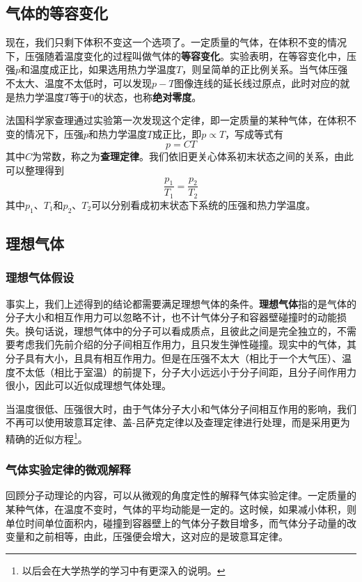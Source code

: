 \subsection{气体的等容变化} 
现在，我们只剩下体积不变这一个选项了。一定质量的气体，在体积不变的情况下，压强随着温度变化的过程叫做气体的\textbf{等容变化}。实验表明，在等容变化中，压强$p$和温度成正比，如果选用热力学温度$T$，则呈简单的正比例关系。当气体压强不太大、温度不太低时，可以发现$p-T$图像连线的延长线过原点，此时对应的就是热力学温度$T$等于$0$的状态，也称\textbf{绝对零度}。

法国科学家查理通过实验第一次发现这个定律，即一定质量的某种气体，在体积不变的情况下，压强$p$和热力学温度$T$成正比，即$p\propto T$，写成等式有$$p=CT$$其中$C$为常数，称之为\textbf{查理定律}。我们依旧更关心体系初末状态之间的关系，由此可以整理得到$$\dfrac{p_1}{T_1}=\dfrac{p_2}{T_2}$$其中$p_1$、$T_1$和$p_2$、$T_2$可以分别看成初末状态下系统的压强和热力学温度。

\subsection{理想气体}
\subsubsection{理想气体假设}
事实上，我们上述得到的结论都需要满足理想气体的条件。\textbf{理想气体}指的是气体的分子大小和相互作用力可以忽略不计，也不计气体分子和容器壁碰撞时的动能损失。换句话说，理想气体中的分子可以看成质点，且彼此之间是完全独立的，不需要考虑我们先前介绍的分子间相互作用力，且只发生弹性碰撞。现实中的气体，其分子具有大小，且具有相互作用力。但是在压强不太大（相比于一个大气压）、温度不太低（相比于室温）的前提下，分子大小远远小于分子间距，且分子间作用力很小，因此可以近似成理想气体处理。

当温度很低、压强很大时，由于气体分子大小和气体分子间相互作用的影响，我们不再可以使用玻意耳定律、盖-吕萨克定律以及查理定律进行处理，而是采用更为精确的近似方程\footnote{以后会在大学热学的学习中有更深入的说明。}。
\subsubsection{气体实验定律的微观解释}
 回顾分子动理论的内容，可以从微观的角度定性的解释气体实验定律。一定质量的某种气体，在温度不变时，气体的平均动能是一定的。这时候，如果减小体积，则单位时间单位面积内，碰撞到容器壁上的气体分子数目增多，而气体分子动量的改变量和之前相等，由此，压强便会增大，这对应的是玻意耳定律。

